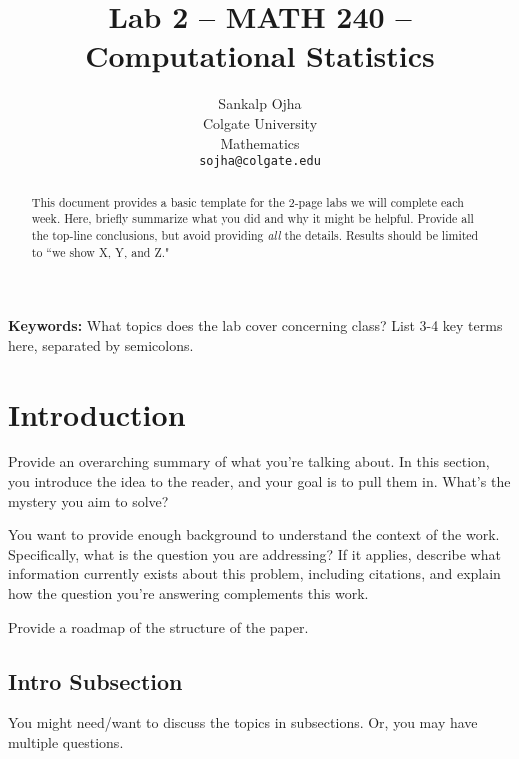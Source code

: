 \documentclass{article}\usepackage[]{graphicx}\usepackage[]{xcolor}
\begin{document}
\vspace{-1in}
\title{Lab 2 -- MATH 240 -- Computational Statistics}

\author{
  Sankalp Ojha \\
  Colgate University  \\
  Mathematics  \\
  {\tt sojha@colgate.edu}
}

\date{}

\maketitle

\begin{multicols}{2}
\begin{abstract}
This document provides a basic template for the 2-page labs we will complete each week. Here, briefly summarize what you did and why it might be helpful. Provide all the top-line conclusions, but avoid providing \emph{all} the details. Results should be limited to ``we show X, Y, and Z."
\end{abstract}

\noindent \textbf{Keywords:} What topics does the lab cover concerning class? List 3-4 key terms here, separated by semicolons.

\section{Introduction}
Provide an overarching summary of what you're talking about. In this section, you introduce the idea to the reader, and your goal is to pull them in. What's the mystery you aim to solve?

You want to provide enough background to understand the context of the work. Specifically, what is the question you are addressing? If it applies, describe what information currently exists about this problem, including citations, and explain how the question you're answering complements this work.

Provide a roadmap of the structure of the paper. 

\subsection{Intro Subsection}
You might need/want to discuss the topics in subsections. Or, you may have multiple questions.



\end{multicols}
\end{document}
